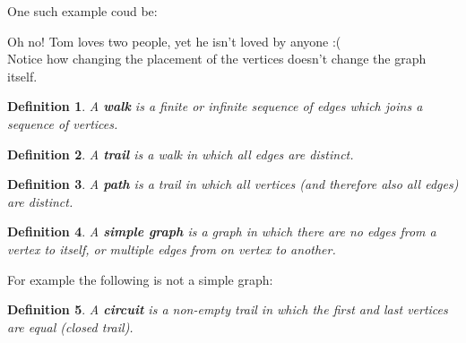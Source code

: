 \documentclass[11pt,a4paper]{article}
\theoremstyle{plain}
\newtheorem{definition}{Definition}[section]
\begin{document}
	One such example coud be:
	\begin{center}\end{center}
	Oh no! Tom loves two people, yet he isn't loved by anyone :( \\
	Notice how changing the placement of the vertices doesn't change the 
	graph itself.
	
	\newpage
	\begin{definition}
	A \textbf{walk} is a finite or infinite sequence of edges which 
	joins a sequence of vertices.
	\end{definition}
	\begin{definition}
	A \textbf{trail} is a walk in which all edges are distinct.
	\end{definition}
	\begin{definition}
	A \textbf{path} is a trail in which all vertices 
	(and therefore also all edges) are distinct.
	\end{definition}
	\begin{definition}
	A \textbf{simple graph} is a graph in which there are no edges from
	a vertex to itself, or multiple edges from on vertex to another.
	\end{definition}
	For example the following is not a simple graph:
	\begin{center}\end{center}
	\begin{definition}
	A \textbf{circuit} is a non-empty trail in which the first and last 
	vertices are equal (closed trail).
	\end{definition}
\end{document}
